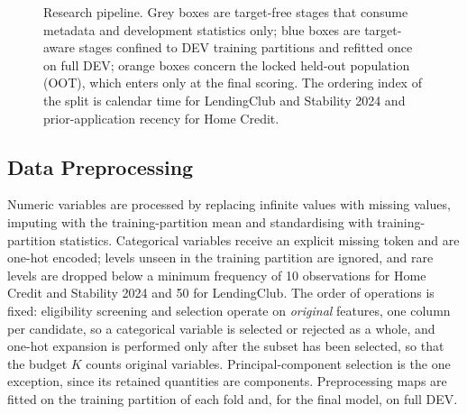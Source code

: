 \documentclass[final,5p,twocolumn]{elsarticle}
\newcommand{\Kfeat}{K}
\begin{document}
\begin{figure}[htbp]
\caption{Research pipeline. Grey boxes are target-free stages that consume metadata and development statistics only; blue boxes are target-aware stages confined to DEV training partitions and refitted once on full DEV; orange boxes concern the locked held-out population (OOT), which enters only at the final scoring. The ordering index of the split is calendar time for LendingClub and Stability 2024 and prior-application recency for Home Credit.}
\label{fig:pipeline}
\end{figure}

\subsection{Data Preprocessing}
\label{subsec:preprocessing}

Numeric variables are processed by replacing infinite values with missing values, imputing with the training-partition mean and standardising with training-partition statistics. Categorical variables receive an explicit missing token and are one-hot encoded; levels unseen in the training partition are ignored, and rare levels are dropped below a minimum frequency of 10 observations for Home Credit and Stability 2024 and 50 for LendingClub. The order of operations is fixed: eligibility screening and selection operate on \emph{original} features, one column per candidate, so a categorical variable is selected or rejected as a whole, and one-hot expansion is performed only after the subset has been selected, so that the budget $\Kfeat$ counts original variables. Principal-component selection is the one exception, since its retained quantities are components. Preprocessing maps are fitted on the training partition of each fold and, for the final model, on full DEV.
\end{document}
